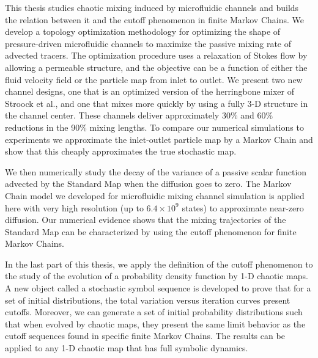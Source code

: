 %
%

This thesis studies chaotic mixing induced by microfluidic channels and builds the relation between it and the cutoff phenomenon in finite Markov Chains. We develop a topology optimization methodology for optimizing the shape of pressure-driven microfluidic channels to maximize the passive mixing rate of advected tracers. The optimization procedure uses a relaxation of Stokes flow by allowing a permeable structure, and the objective can be a function of either the fluid velocity field or the particle map from inlet to outlet. We present two new channel
designs, one that is an optimized version of the herringbone mixer of Stroock et al., and one that mixes more quickly by using a fully 3-D structure in the channel center. These channels deliver approximately 30\% and 60\% reductions in the 90\% mixing lengths. To compare our numerical simulations to experiments we approximate the inlet-outlet particle map by a Markov Chain and show that this cheaply approximates the true stochastic map.

We then numerically study the decay of the variance of a passive scalar function advected by the Standard Map when the diffusion goes to zero. The Markov Chain model we developed for microfluidic mixing channel simulation is applied here with very high resolution (up to $6.4 \times 10^9$ states) to approximate near-zero diffusion. Our numerical evidence shows that the mixing trajectories of the Standard Map can be characterized by using the cutoff phenomenon for finite Markov Chains.

In the last part of this thesis, we apply the definition of the cutoff phenomenon to the study of the evolution of a probability density function by 1-D chaotic maps. A new object called a stochastic symbol sequence is developed to prove that for a set of initial distributions, the total variation versus iteration curves present cutoffs. Moreover, we can generate a set of initial probability distributions such that when evolved by chaotic maps, they present the same limit behavior as the cutoff sequences found in specific finite Markov Chains. The results can be applied to any 1-D chaotic map that has full symbolic dynamics.
